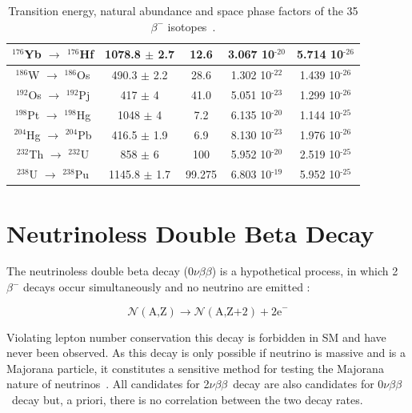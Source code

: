\documentclass[main.tex]{subfiles}
\begin{document}
\begin{table}
\begin{tabular}{|c|c|c|c|c|}
\hline
$^{\text{176}}$Yb $\rightarrow$ $^{\text{176}}$Hf & 1078.8 $\pm$ 2.7 & 12.6   & 3.067 10$^{\text{-20}}$ & 5.714 10$^{\text{-26}}$\\ 
\hline
$^{\text{186}}$W $\rightarrow$ $^{\text{186}}$Os & 490.3   $\pm$ 2.2 & 28.6   & 1.302 10$^{\text{-22}}$ & 1.439 10$^{\text{-26}}$\\ 
\hline
$^{\text{192}}$Os $\rightarrow$ $^{\text{192}}$Pj & 417    $\pm$ 4   & 41.0   & 5.051 10$^{\text{-23}}$ & 1.299 10$^{\text{-26}}$\\ 
\hline 
$^{\text{198}}$Pt $\rightarrow$ $^{\text{198}}$Hg & 1048   $\pm$ 4   & 7.2    & 6.135 10$^{\text{-20}}$ & 1.144 10$^{\text{-25}}$\\
\hline 
$^{\text{204}}$Hg $\rightarrow$ $^{\text{204}}$Pb & 416.5  $\pm$ 1.9 & 6.9    & 8.130 10$^{\text{-23}}$ & 1.976 10$^{\text{-26}}$\\
\hline 
$^{\text{232}}$Th $\rightarrow$ $^{\text{232}}$U & 858     $\pm$ 6   & 100    & 5.952 10$^{\text{-20}}$ & 2.519 10$^{\text{-25}}$\\
\hline 
$^{\text{238}}$U $\rightarrow$ $^{\text{238}}$Pu & 1145.8  $\pm$ 1.7 & 99.275 & 6.803 10$^{\text{-19}}$ & 5.952 10$^{\text{-25}}$\\ 
\hline
\end{tabular}
\caption{Transition energy, natural abundance and space phase factors of the 35 $\beta^{-}$ isotopes~\cite{ParameterBBisotopes}.}
\label{tab:2nuIsotopes}
\end{table}


\FloatBarrier


\section{Neutrinoless Double Beta Decay}\label{sec:0NeutrinoDBD}


\NI The neutrinoless double beta decay (0$\nu\beta\beta$) is a hypothetical process, in which 2$\beta^{-}$ decays occur simultaneously and no neutrino are emitted :


\begin{equation}
\mathcal{N} (\text{A,Z}) \rightarrow \mathcal{N} (\text{A,Z+2}) + \text{2e}^- 
\end{equation}


\bigskip


\NI Violating lepton number conservation this decay is forbidden in SM and have never been observed. As this decay is only possible if neutrino is massive and is a Majorana particle, it constitutes a sensitive method for testing the Majorana nature of neutrinos~\cite{RacahNeutrinolessDBDMajorana}. All candidates for 2$\nu\beta\beta$~decay are also candidates for 0$\nu\beta\beta$~decay but, a priori, there is no correlation between the two decay rates. 
\end{document}
